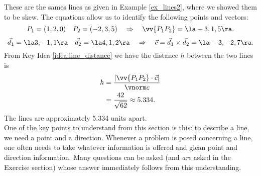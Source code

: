 {These are the sames lines as given in Example \ref{ex_lines2}, where we showed them to be skew. The equations allow us to identify the following points and vectors:
$$P_1 = (1,2,0)\quad P_2 = (-2,3,5) \quad \Rightarrow \quad \vv{P_1P_2} = \la -3,1,5\ra.$$
$$\vec d_1 = \la 3,-1,1\ra \quad \vec d_2 = \la 4,1,2\ra \quad \Rightarrow \quad \vec c = \vec d_1\times \vec d_2 = \la -3,-2,7\ra.$$
From Key Idea \ref{idea:line_distance} we have the distance $h$ between the two lines is
\begin{align*}
h &= \frac{|\vv{P_1P_2}\cdot \vec c|}{\vnorm c}\\
&=\frac{42}{\sqrt{62}} \approx 5.334.
\end{align*}
The lines are approximately 5.334 units apart.
}\\

One of the key points to understand from this section is this: to describe a line, we need a point and a direction. Whenever a problem is posed concerning a line, one often needs to take whatever information is offered and glean point and direction information. Many questions can be asked (and \emph{are} asked in the Exercise section) whose answer immediately follows from this understanding. 





